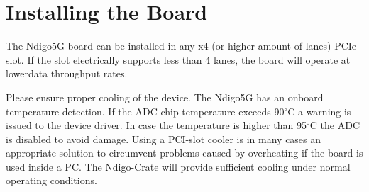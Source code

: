 \section{Installing the Board}
	\balance
The Ndigo5G board can be installed in any x4 (or higher amount of lanes) PCIe slot. If the slot electrically supports less than 4 lanes, the board will operate at lowerdata throughput rates.\par
Please ensure proper cooling of the device. The Ndigo5G has an onboard temperature detection. If the ADC chip temperature exceeds 90$^{\circ}$C a warning is issued to the device driver. In case the temperature is higher than 95$^{\circ}$C the ADC is disabled to avoid damage. Using a PCI-slot cooler is in many cases an appropriate solution to circumvent problems caused by overheating if the board is used inside a PC. The Ndigo-Crate will provide sufficient cooling under normal operating conditions.\par
  

